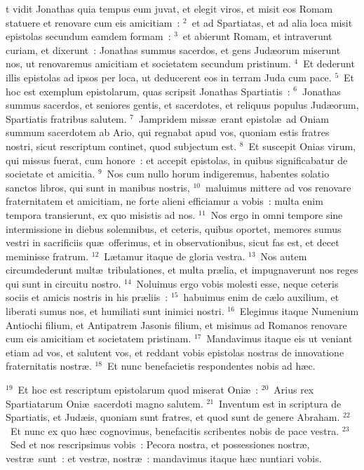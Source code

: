 \bchapter
{}t vidit Jonathas quia tempus eum juvat, et elegit viros, et misit eos Romam statuere et renovare cum eis amicitiam~:
${}^{2}$~et ad Spartiatas, et ad alia loca misit epistolas secundum eamdem formam~:
${}^{3}$~et abierunt Romam, et intraverunt curiam, et dixerunt~: Jonathas summus sacerdos, et gens Jud\ae orum miserunt nos, ut renovaremus amicitiam et societatem secundum pristinum.
${}^{4}$~Et dederunt illis epistolas ad ipsos per loca, ut deducerent eos in terram Juda cum pace.
${}^{5}$~Et hoc est exemplum epistolarum, quas scripsit Jonathas Spartiatis~:
${}^{6}$~Jonathas summus sacerdos, et seniores gentis, et sacerdotes, et reliquus populus Jud\ae orum, Spartiatis fratribus salutem.
${}^{7}$~Jampridem miss\ae\ erant epistol\ae\ ad Oniam summum sacerdotem ab Ario, qui regnabat apud vos, quoniam estis fratres nostri, sicut rescriptum continet, quod subjectum est.
${}^{8}$~Et suscepit Onias virum, qui missus fuerat, cum honore~: et accepit epistolas, in quibus significabatur de societate et amicitia.
${}^{9}$~Nos cum nullo horum indigeremus, habentes solatio sanctos libros, qui sunt in manibus nostris,
${}^{10}$~maluimus mittere ad vos renovare fraternitatem et amicitiam, ne forte alieni efficiamur a vobis~: multa enim tempora transierunt, ex quo misistis ad nos.
${}^{11}$~Nos ergo in omni tempore sine intermissione in diebus solemnibus, et ceteris, quibus oportet, memores sumus vestri in sacrificiis qu\ae\ offerimus, et in observationibus, sicut fas est, et decet meminisse fratrum.
${}^{12}$~L\ae tamur itaque de gloria vestra.
${}^{13}$~Nos autem circumdederunt mult\ae\ tribulationes, et multa pr\ae lia, et impugnaverunt nos reges qui sunt in circuitu nostro.
${}^{14}$~Noluimus ergo vobis molesti esse, neque ceteris sociis et amicis nostris in his pr\ae liis~:
${}^{15}$~habuimus enim de c\ae lo auxilium, et liberati sumus nos, et humiliati sunt inimici nostri.
${}^{16}$~Elegimus itaque Numenium Antiochi filium, et Antipatrem Jasonis filium, et misimus ad Romanos renovare cum eis amicitiam et societatem pristinam.
${}^{17}$~Mandavimus itaque eis ut veniant etiam ad vos, et salutent vos, et reddant vobis epistolas nostras de innovatione fraternitatis nostr\ae .
${}^{18}$~Et nunc benefacietis respondentes nobis ad h\ae c.


${}^{19}$~Et hoc est rescriptum epistolarum quod miserat Oni\ae~:
${}^{20}$~Arius rex Spartiatarum Oni\ae\ sacerdoti magno salutem.
${}^{21}$~Inventum est in scriptura de Spartiatis, et Jud\ae is, quoniam sunt fratres, et quod sunt de genere Abraham.
${}^{22}$~Et nunc ex quo h\ae c cognovimus, benefacitis scribentes nobis de pace vestra.
${}^{23}$~Sed et nos rescripsimus vobis~: Pecora nostra, et possessiones nostr\ae , vestr\ae\ sunt~: et vestr\ae , nostr\ae~: mandavimus itaque h\ae c nuntiari vobis.


